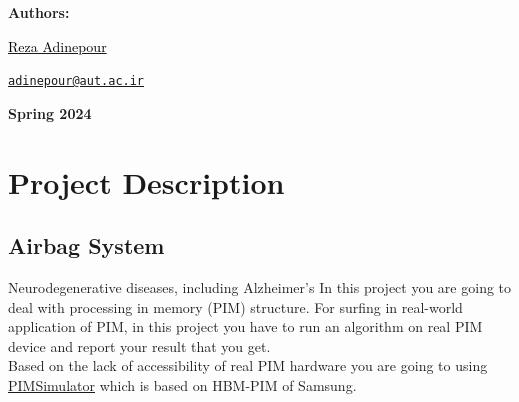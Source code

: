 \documentclass[12pt]{article}
\begin{document}
\begin{flushleft}
    \textbf{\selectfont Authors:}
\end{flushleft}

\begin{center}
    \begin{minipage}{0.5\textwidth}
        \begin{flushleft}
            \href{https://rezaadinepour.github.io/}{\textcolor{black}{Reza Adinepour}}\\
        \end{flushleft}
    \end{minipage}%
    \begin{minipage}{0.5\textwidth}
        \begin{flushright}
            \href{mailto:adinepour@aut.ac.ir}{\texttt{adinepour@aut.ac.ir}}
        \end{flushright}
    \end{minipage}
\end{center}

\vspace{1em}

    
\begin{center}
    \bigskip \bigskip \bigskip \bigskip
    \large \bf {}\selectfont Spring 2024
\end{center}

\thispagestyle{empty}

\setcounter{page}{0}

\newpage

\tableofcontents

\newpage


\section{Project Description}

\subsection{Airbag System}
Neurodegenerative diseases, including Alzheimer's In this project you are going to deal with processing in memory (PIM) structure. For surfing in real-world application of PIM, in this project you have to run an algorithm on real PIM device and report your result that you get.\\
Based on the lack of accessibility of real PIM hardware you are going to using \href{https://github.com/SAITPublic/PIMSimulator}{PIMSimulator} which is based on HBM-PIM of Samsung.
\end{document}
